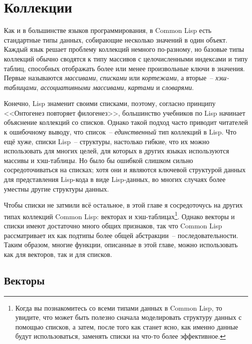 \chapter{Коллекции}
\label{ch:11}

\thispagestyle{empty}

Как и в большинстве языков программирования, в Common Lisp есть стандартные типы данных,
собирающие несколько значений в один объект.  Каждый язык решает проблему коллекций
немного по-разному, но базовые типы коллекций обычно сводятся к типу массивов с целочисленными
индексами и типу таблиц, способных отображать более или менее
произвольные ключи в значения.  Первые называются \textit{массивами}, \textit{списками} или \textit{кортежами}, а
вторые~-- \textit{хэш-таблицами}, \textit{ассоциативными массивами}, \textit{картами} и \textit{словарями}.

Конечно, Lisp знаменит своими списками, поэтому, согласно принципу <<Онтогенез повторяет
филогенез>>, большинство учебников по Lisp начинает объяснение коллекций со
списков. Однако такой подход часто приводит читателей к ошибочному выводу, что
список~-- \textit{единственный} тип коллекций в Lisp.  Что ещё хуже,
списки Lisp~-- структуры, настолько гибкие, что их можно использовать для многих целей, для
которых в других языках используются массивы и хэш-таблицы.  Но было бы ошибкой слишком
сильно сосредоточиваться на списках; хотя они и являются ключевой структурой данных для
представления Lisp-кода в виде Lisp-данных, во многих случаях более уместны другие структуры данных.

Чтобы списки не затмили всё остальное, в этой главе я сосредоточусь на других типах
коллекций Common Lisp: векторах и хэш-таблицах\footnote{Когда вы познакомитесь со всеми
  типами данных в Common Lisp, то увидите, что может быть полезно сначала моделировать
  структуру данных с помощью списков, а затем, после того как станет ясно, как именно данные
  будут использоваться, заменять списки на что-то более эффективное.}.
Однако векторы и списки имеют достаточно много общих признаков, так что Common Lisp
рассматривает их как подтипы более общей абстракции~-- последовательности.  Таким образом,
многие функции, описанные в этой главе, можно использовать как для векторов, так и для
списков.

\section{Векторы}

